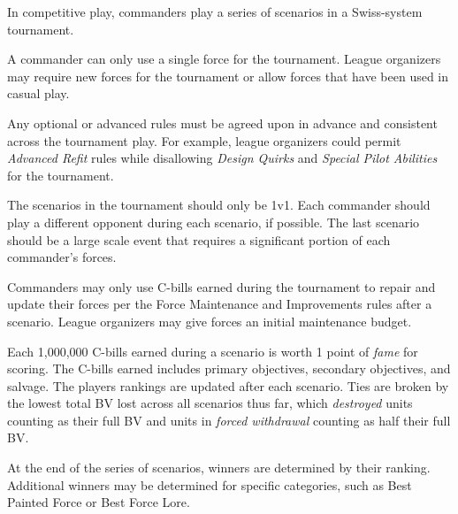 In competitive play, commanders play a series of scenarios in a Swiss-system tournament.

A commander can only use a single force for the tournament.
League organizers may require new forces for the tournament or allow forces that have been used in casual play.

Any optional or advanced rules must be agreed upon in advance and consistent across the tournament play.
For example, league organizers could permit \emph{Advanced Refit} rules while disallowing \emph{Design Quirks} and \emph{Special Pilot Abilities} for the tournament.

The scenarios in the tournament should only be 1v1.
Each commander should play a different opponent during each scenario, if possible.
The last scenario should be a large scale event that requires a significant portion of each commander's forces.

Commanders may only use C-bills earned during the tournament to repair and update their forces per the Force Maintenance and Improvements rules after a scenario.
League organizers may give forces an initial maintenance budget.

Each 1,000,000 C-bills earned during a scenario is worth 1 point of \emph{fame} for scoring.
The C-bills earned includes primary objectives, secondary objectives, and salvage.
The players rankings are updated after each scenario.
Ties are broken by the lowest total BV lost across all scenarios thus far, which \emph{destroyed} units counting as their full BV and units in \emph{forced withdrawal} counting as half their full BV.

At the end of the series of scenarios, winners are determined by their ranking.
Additional winners may be determined for specific categories, such as Best Painted Force or Best Force Lore.
